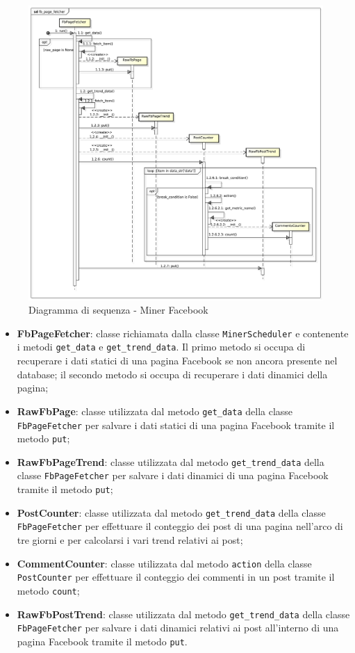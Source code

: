    \begin{figure}[!htbp]
		\centering
			\centerline{\includegraphics[scale=0.4]{./images/sequence_diagram/fb_page_fetcher.pdf}}
		\caption{Diagramma di sequenza - Miner Facebook}
	\end{figure}


    \begin{itemize}
        \item \textbf{FbPageFetcher}: classe richiamata dalla classe \texttt{MinerScheduler} e contenente i metodi \texttt{get\_data} e \texttt{get\_trend\_data}. Il primo metodo si occupa di recuperare i dati statici di una pagina Facebook se non ancora presente nel database; il secondo metodo si occupa di recuperare i dati dinamici della pagina;
        \item \textbf{RawFbPage}: classe utilizzata dal metodo \texttt{get\_data} della classe \texttt{FbPageFetcher} per salvare i dati statici di una pagina Facebook tramite il metodo \texttt{put};
        \item \textbf{RawFbPageTrend}: classe utilizzata dal metodo \texttt{get\_trend\_data} della classe \texttt{FbPageFetcher} per salvare i dati dinamici di una pagina Facebook tramite il metodo \texttt{put};
        \item \textbf{PostCounter}: classe utilizzata dal metodo \texttt{get\_trend\_data} della classe \texttt{FbPageFetcher} per effettuare il conteggio dei post di una pagina nell'arco di tre giorni e per calcolarsi i vari trend relativi ai post;
        \item \textbf{CommentCounter}: classe utilizzata dal metodo \texttt{action} della classe \texttt{PostCounter} per effettuare il conteggio dei commenti in un post tramite il metodo \texttt{count};
        \item \textbf{RawFbPostTrend}: classe utilizzata dal metodo \texttt{get\_trend\_data} della classe \texttt{FbPageFetcher} per salvare i dati dinamici relativi ai post all'interno di una pagina Facebook tramite il metodo \texttt{put}.
    \end{itemize}


